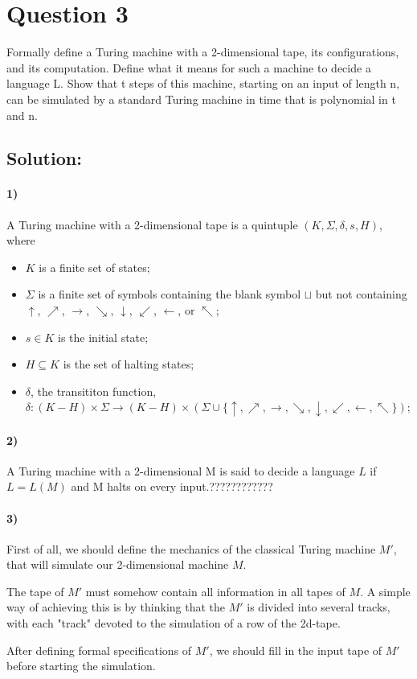 \documentclass[12pt]{article}
\begin{document}
\section*{Question 3}
Formally define a Turing machine with a 2-dimensional tape, its configurations, and its computation.
Define what it means for such a machine to decide a language L. Show that t steps of this machine,
starting on an input of length n, can be simulated by a standard Turing machine in time that is
polynomial in t and n.
\subsection*{Solution:}
\paragraph{1)} A Turing machine with a 2-dimensional tape is a quintuple $(K, \Sigma, \delta, s, H)$, where

\begin{itemize}
    \item $K$ is a finite set of states;
    \item $\Sigma$ is a finite set of symbols containing the blank symbol $\sqcup$ but not containing $\uparrow$, $\nearrow$, $\rightarrow$, $\searrow$, $\downarrow$, $\swarrow$, $\leftarrow$, or $\nwarrow$;
    \item $s\in K$ is the initial state;
    \item $H \subseteq K$ is the set of halting states;
    \item $\delta$, the transititon function, $\delta: (K - H) \times  \Sigma \to (K - H) \times (\Sigma \cup \{\uparrow, \nearrow, \rightarrow, \searrow, \downarrow, \swarrow, \leftarrow, \nwarrow\})$;
\end{itemize}

\paragraph{2)} A Turing machine with a 2-dimensional M is said to decide a language $L$ if $L = L(M)$ and M halts on every input.????????????

\paragraph{3)} First of all, we should define the mechanics of the classical Turing machine $M'$, that will simulate our 2-dimensional machine $M$.

The tape of $M'$ must somehow contain all information in all tapes of $M$. A simple way of achieving this is by thinking that the $M'$ is divided into several tracks, with each "track" devoted to the simulation of a row of the 2d-tape.

After defining formal specifications of $M'$, we should fill in the input tape of $M'$ before starting the simulation.
\end{document}
